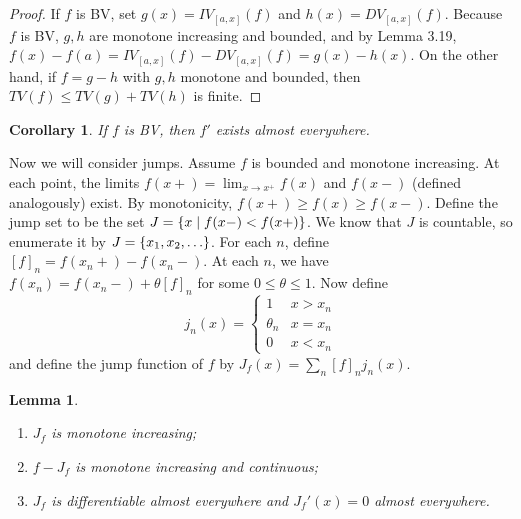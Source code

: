 \documentclass[leqno, openany]{memoir}
\newtheorem{cor}[thm]{Corollary}
\newtheorem{lem}[thm]{Lemma}
\theoremstyle{definition}
\theoremstyle{remark}
\theoremstyle{plain}
\theoremstyle{definition}
\theoremstyle{remark}
\begin{document}
\begin{proof}
    If $f$ is BV, set $g(x) = IV_{[a,x]}(f)$ and $h(x) = DV_{[a,x]}(f)$. Because $f$ is BV, $g,h$ are monotone increasing and bounded, and by Lemma 3.19, $f(x) - f(a) = IV_{[a,x]}(f) - DV_{[a,x]}(f) = g(x) - h(x)$. On the other hand, if $f = g-h$ with $g,h$ monotone and bounded, then $TV(f) \leq TV(g) + TV(h)$ is finite.
\end{proof}

\begin{cor}
    If $f$ is BV, then $f'$ exists almost everywhere.
\end{cor}

Now we will consider jumps. Assume $f$ is bounded and monotone increasing. At each point, the limits $f(x+) = \lim_{x \to x^+} f(x)$ and $f(x-)$ (defined analogously) exist. By monotonicity, $f(x+) \geq f(x) \geq f(x-)$. Define the jump set to be the set $J = \qty{x \mid f(x-) < f(x+)}$. We know that $J$ is countable, so enumerate it by $J = \qty{x_1, x_2, \ldots}$. For each $n$, define $[f]_n = f(x_n+) - f(x_n-)$. At each $n$, we have $f(x_n) = f(x_n-) + \theta[f]_n$ for some $0 \leq \theta \leq 1$. Now define
\[ j_n(x) = \begin{cases}
    1 & x > x_n \\
    \theta_n & x = x_n \\
    0 & x < x_n
\end{cases} \]
and define the jump function of $f$ by $J_f(x) = \sum_n [f]_n j_n(x)$.

\begin{lem}
    \begin{enumerate}
        \item $J_f$ is monotone increasing;
        \item $f - J_f$ is monotone increasing and continuous;
        \item $J_f$ is differentiable almost everywhere and $J_f'(x) = 0$ almost everywhere.
    \end{enumerate}
\end{lem}
\end{document}
